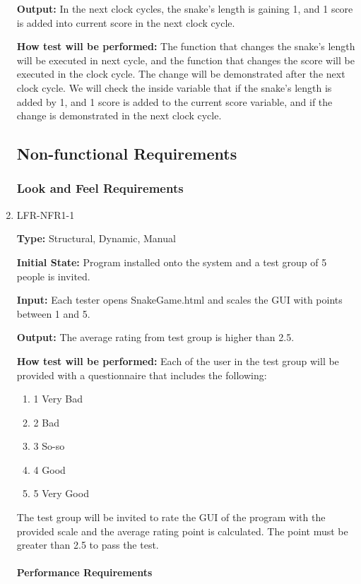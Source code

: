 \documentclass[12pt, titlepage]{article}
\begin{document}
\begin{enumerate}
\textbf{Output:} In the next clock cycles, the snake's length is gaining 1, and 1 score is added into current score in the next clock cycle.

\textbf{How test will be performed:} The function that changes the snake's length will be executed in next cycle, and the function that changes the score will be executed in the clock cycle. The change will be demonstrated after the next clock cycle. We will check the inside variable that if the snake's length is added by 1, and 1 score is added to the current score variable, and if the change is demonstrated in the next clock cycle.

\subsection{Non-functional Requirements}

\subsubsection{Look and Feel Requirements}
			
\item{LFR-NFR1-1}

\textbf{Type:} Structural, Dynamic, Manual

\textbf{Initial State:} Program installed onto the system and a test group of 5 people is invited.

\textbf{Input:} Each tester opens SnakeGame.html and scales the GUI with points between 1 and 5.

\textbf{Output:} The average rating from test group is higher than 2.5.

\textbf{How test will be performed:} Each of the user in the test group will be provided with a questionnaire that includes the following:
\begin{enumerate}
    \item 1 Very Bad
    \item 2 Bad
    \item 3 So-so
    \item 4 Good
    \item 5 Very Good
\end{enumerate}
The test group will be invited to rate the GUI of the program with the provided scale and the average rating point is calculated. The point must be greater than 2.5 to pass the test.

\paragraph{Performance Requirements}


\end{enumerate}
\end{document}

